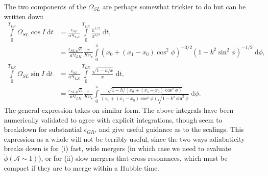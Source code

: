 \documentclass[11pt,
        usenames, %
        dvipsnames %
    ]{article}
\newcommand*{\bm}[1]{\boldsymbol{\mathbf{#1}}}
\newcommand*{\p}[1]{\left(#1\right)}
\begin{document}
The two components of the $\Omega_{SL}$ are perhaps somewhat trickier to do but
can be written down
\begin{align}
    \int\limits_0^{T_{LK}}\Omega_{SL} \cos I\;\mathrm{d}t
        &= \frac{\epsilon_{SL}}{a^4t_{LK}}\int\limits_0^{T_{LK}}
            \frac{h^{1/2}}{x^{3/2}}\;\mathrm{d}t,\\
        &= \frac{\epsilon_{SL}\sqrt{h}}{a^4t_{LK}}\frac{\pi}{K n_e}
            \int\limits_0^\pi
                \p{x_0 + (x_1 - x_0)\cos^2\phi}^{-3/2}
                    \p{1 - k^2\sin^2\phi}^{-1/2} \;\mathrm{d}\phi,\\
    \int\limits_0^{T_{LK}}\Omega_{SL} \sin I\;\mathrm{d}t
        &= \frac{\epsilon_{SL}}{a^4t_{LK}}\int\limits_0^{T_{LK}}
            \frac{\sqrt{1 - h/x}}{x}\;\mathrm{d}t,\\
        &= \frac{\epsilon_{SL}\sqrt{h}}{a^4t_{LK}}\frac{\pi}{K n_e}
            \int\limits_0^\pi
                \frac{\sqrt{1 - h/\p{x_0 + (x_1 - x_0)\cos^2\phi}}}{
                    \p{x_0 + (x_1 - x_0)\cos^2\phi}\sqrt{1 - k^2\sin^2\phi}}
                    \;\mathrm{d}\phi.
\end{align}
The general expression takes on similar form. The above integrals have been
numerically validated to agree with explicit integrations, though seem to
breakdown for substantial $\epsilon_{GR}$, and give useful guidance as to the
scalings. This expression as a whole will not be terribly useful, since the two
ways adiabaticity breaks down is for (i) fast, wide mergers (in which case we
need to evaluate $\dot{\phi}\p{\mathcal{A} \sim 1}$), or for (ii) slow mergers
that cross resonances, which must be compact if they are to merge within a
Hubble time.


\end{document}
